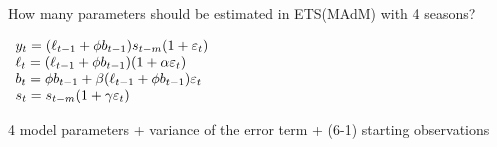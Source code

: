 
\begin{question}
How many parameters should be estimated in ETS(MAdM) with 4 seasons?

\(\begin{array}{l c r}{y_{t}=(\ell_{t-1}+\phi b_{t-1})s_{t-m}(1+\varepsilon_{t})}\\ {\ell_{t}=(\ell_{t-1}+\phi b_{t-1})(1+\alpha\varepsilon_{t})}\\ {b_{t}=\phi b_{t-1}+\beta(\ell_{t-1}+\phi b_{t-1})\varepsilon_{t}}\\ {s_{t}=s_{t-m}(1+\gamma\varepsilon_{t})}&{}\end{array}\)
\end{question}

\begin{solution}
4 model parameters + variance of the error term + (6-1) starting observations
\end{solution}

